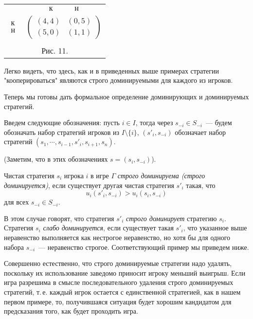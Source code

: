 \documentclass[12pt]{article}
\begin{document}
\begin{center}
\begin{tabular}{cc}
&$\begin{array}{cc} к\quad& \quad н \end{array}$\\
$\begin{array}{c} к\\ н \end{array}$& $\left(\begin{array}{cc}
(4,4)&(0,5)\\
(5,0)&(1,1) \end{array}\right)$\\
\multicolumn{2}{c}{}\\
\multicolumn{2}{c}{Рис. 11.}\\
\end{tabular}
\end{center}

Легко видеть, что здесь, как и в приведенных выше примерах стратегии
"кооперироваться" являются строго доминируемыми для каждого из
игроков.

Теперь мы готовы дать формальное определение доминирующих и
доминируемых стратегий.

Введем следующие обозначения: пусть $i\in I$, тогда через $s_{-i}\in
S_{-i}$~--- будем обозначать набор стратегий игроков из
$I\setminus\{i\}$, $(s'_i,s_{-i})$ обозначает набор стратегий
$(s_1,\cdots,s_{i-1},s'_i,s_{i+1},s_n)$.

(Заметим, что в этих обозначениях $s=(s_i,s_{-i})$).


Чистая стратегия $s_i$ игрока $i$ в игре $\Gamma$ \emph{строго
доминируема (строго доминируется)}, если существует другая чистая
стратегия $s'_i$ такая, что
$$ u_i(s'_i,s_{-i})>u_i(s_i,s_{-i}) $$ для всех
$s_{-i}\in S_{-i}$.


В этом случае говорят, что стратегия $s'_i$ \emph{строго
доминирует} стратегию $s_i$.  Стратегия $s_i$ {\it слабо
доминируется}, если существует такая $s'_i$, что указанное выше
неравенство выполняется как нестрогое неравенство, но хотя бы для
одного набора $s_{-i}$~--- неравенство строгое. Соответствующий
пример мы приведем ниже.

Совершенно естественно, что строго доминируемые стратегии надо
удалять, поскольку их использование заведомо приносит игроку меньший
выигрыш. Если игра разрешима в смысле последовательного удаления
строго доминируемых стратегий, т.\,е. каждый игрок остается с
единственной стратегией, как в нашем первом примере, то,
получившаяся ситуация будет хорошим кандидатом для предсказания
того, как будет проходить игра.
\end{document}
